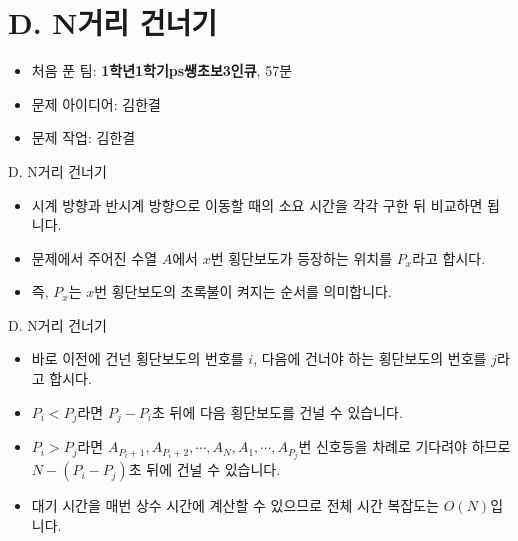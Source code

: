 \def\probno{D}
\def\probtitle{N거리 건너기}

\section{\probno{}. \probtitle{}}

\begin{frame} %
    \sectiontitle{\probno{}}{\probtitle{}}
    \begin{itemize}
        \item 처음 푼 팀: \textbf{1학년1학기ps쌩초보3인큐}, 57분
        \item 문제 아이디어: 김한결
        \item 문제 작업: 김한결
    \end{itemize}
\end{frame}

\begin{frame}{\probno{}. \probtitle{}}
    \begin{itemize}
        \item 시계 방향과 반시계 방향으로 이동할 때의 소요 시간을 각각 구한 뒤 비교하면 됩니다.
        \item 문제에서 주어진 수열 $A$에서 $x$번 횡단보도가 등장하는 위치를 $P_x$라고 합시다.
        \item 즉, $P_x$는 $x$번 횡단보도의 초록불이 켜지는 순서를 의미합니다.
    \end{itemize}
\end{frame}

\begin{frame}{\probno{}. \probtitle{}}
    \begin{itemize}
        \item 바로 이전에 건넌 횡단보도의 번호를 $i$, 다음에 건너야 하는 횡단보도의 번호를 $j$라고 합시다.
        \item $P_i < P_j$라면 $P_j - P_i$초 뒤에 다음 횡단보도를 건널 수 있습니다.
        \item $P_i > P_j$라면 $A_{P_i+1}, A_{P_i+2}, \cdots, A_N, A_1, \cdots, A_{P_j}$번 신호등을 차례로 기다려야 하므로 $N-(P_i-P_j)$초 뒤에 건널 수 있습니다.
        \item 대기 시간을 매번 상수 시간에 계산할 수 있으므로 전체 시간 복잡도는 $O(N)$입니다.
    \end{itemize}
\end{frame}